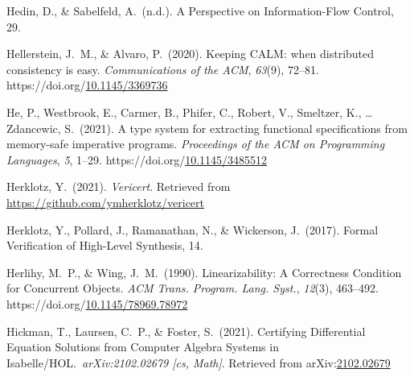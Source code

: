 \documentclass[12pt,twoside]{article}
\begin{document}
{\begin{thebibliography}{1079}
\mdbibitemlabel{}Hedin, D., \& Sabelfeld, A.~(n.d.). A Perspective on Information-Flow Control, 29.%

\mdbibitemlabel{}Hellerstein, J.~M., \& Alvaro, P.~(2020). Keeping CALM: when distributed consistency is easy. \emph{Communications of the ACM}, \emph{63}(9), 72–81. https://doi.org/\href{https://dx.doi.org/10.1145/3369736}{10.1145/3369736}%

\mdbibitemlabel{}He, P., Westbrook, E., Carmer, B., Phifer, C., Robert, V., Smeltzer, K., … Zdancewic, S.~(2021). A type system for extracting functional specifications from memory-safe imperative programs. \emph{Proceedings of the ACM on Programming Languages}, \emph{5}, 1–29. https://doi.org/\href{https://dx.doi.org/10.1145/3485512}{10.1145/3485512}%

\mdbibitemlabel{}Herklotz, Y.~(2021). \emph{Vericert}. Retrieved from \href{https://github.com/ymherklotz/vericert}{{\ttfamily https://\hspace{0pt}github.\hspace{0pt}com/\hspace{0pt}ymherklotz/\hspace{0pt}vericert}}%

\mdbibitemlabel{}Herklotz, Y., Pollard, J., Ramanathan, N., \& Wickerson, J.~(2017). Formal Verification of High-Level Synthesis, 14.%

\mdbibitemlabel{}Herlihy, M.~P., \& Wing, J.~M.~(1990). Linearizability: A Correctness Condition for Concurrent Objects. \emph{ACM Trans. Program. Lang. Syst.}, \emph{12}(3), 463–492. https://doi.org/\href{https://dx.doi.org/10.1145/78969.78972}{10.1145/78969.78972}%

\mdbibitemlabel{}Hickman, T., Laursen, C.~P., \& Foster, S.~(2021). Certifying Differential Equation Solutions from Computer Algebra Systems in Isabelle/HOL.~\emph{arXiv:2102.02679 {}[cs, Math]}. Retrieved from arXiv:\href{http://arxiv.org/abs/2102.02679}{2102.02679}%


\end{thebibliography}}
\end{document}
